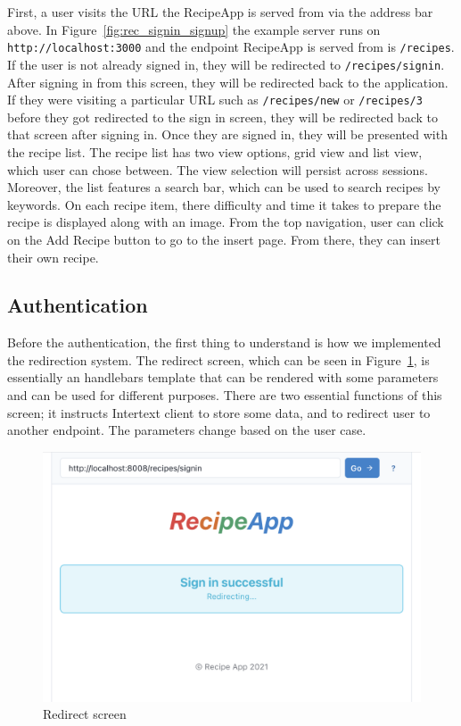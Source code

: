 First, a user visits the URL the RecipeApp is served from via the address bar above. In Figure~\ref{fig:rec_signin_signup} the example server runs on \texttt{http://localhost:3000} and the endpoint RecipeApp is served from is \texttt{/recipes}. If the user is not already signed in, they will be redirected to \texttt{/recipes/signin}. After signing in from this screen, they will be redirected back to the application. If they were visiting a particular URL such as \texttt{/recipes/new} or \texttt{/recipes/3} before they got redirected to the sign in screen, they will be redirected back to that screen after signing in. Once they are signed in, they will be presented with the recipe list. The recipe list has two view options, grid view and list view, which user can chose between. The view selection will persist across sessions. Moreover, the list features a search bar, which can be used to search recipes by keywords. On each recipe item, there difficulty and time it takes to prepare the recipe is displayed along with an image. From the top navigation, user can click on the Add Recipe button to go to the insert page. From there, they can insert their own recipe.

\subsection{Authentication}

Before the authentication, the first thing to understand is how we implemented the redirection system. The redirect screen, which can be seen in Figure~\ref{fig:rec_redirect}, is essentially an handlebars template that can be rendered with some parameters and can be used for different purposes. There are two essential functions of this screen; it instructs Intertext client to store some data, and to redirect user to another endpoint. The parameters change based on the user case.

\begin{figure}[htb]
  \centering
  \includegraphics[width=12.4cm]{thesis/paper/images/rec_redirect.png}
  \caption{Redirect screen}%
  \label{fig:rec_redirect}%
\end{figure}

